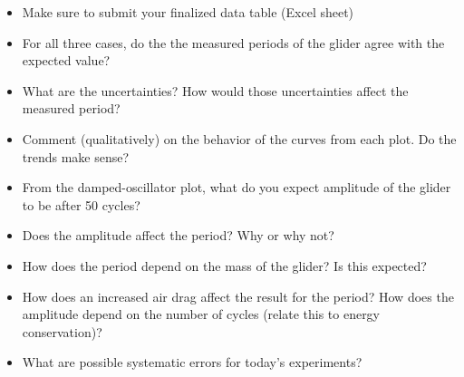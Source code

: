 \begin{itemize}
\item Make sure to submit your finalized data table (Excel sheet)
\item For all three cases, do the the measured periods of the glider agree with the expected value?
\item What are the uncertainties? How would those uncertainties affect the measured period?

\item Comment (qualitatively) on the behavior of the curves from each plot. Do the trends make sense?
\item From the damped-oscillator plot, what do you expect amplitude of the glider to be after 50 cycles?



\item Does the amplitude affect the period? Why or why not?
\item How does the period depend on the mass of the glider? Is this expected?
\item How does an increased air drag affect the result for the period?
\subitem How does the amplitude depend on the number of cycles (relate this to energy conservation)?

\item What are possible systematic errors for today's experiments?


\end{itemize}

